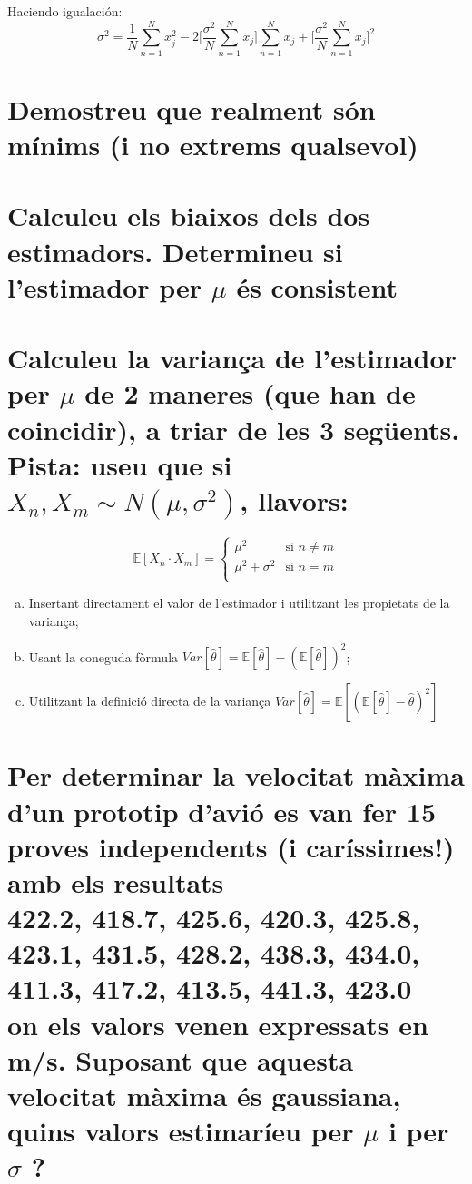 \documentclass[a4paper,10pt]{article}
\begin{document}
Haciendo igualación:
\begin{equation*}
\sigma^2 = \frac{1}{N}\sum_{n = 1}^{N} x_j^2 -2\Big[\frac{\sigma^2}{N}\sum_{n = 1}^{N} x_j\Big]\sum_{n = 1}^{N} x_j + \Big[\frac{\sigma^2}{N}\sum_{n = 1}^{N} x_j\Big]^2
\end{equation*}

\section{Demostreu que realment són mínims (i no extrems qualsevol)}

\section{Calculeu els biaixos dels dos estimadors. Determineu si l'estimador per $\mu$ és consistent}

\section{Calculeu la variança de l'estimador per $\mu$ de 2 maneres (que han de coincidir), a triar de les 3 següents. Pista: useu que si $X_n,X_m \sim N(\mu,\sigma^2)$, llavors:}

\begin{equation*}
\mathbb{E} [ X_n \cdot X_m ] = 
 \begin{cases} 
      \mu^2 & \text{si } n \neq m \\
      \mu^2 + \sigma^2 & \text{si } n = m\\
   \end{cases}
\end{equation*}

\begin{enumerate}[(a)]
\item Insertant directament el valor de l'estimador i utilitzant les propietats de la variança;
\item Usant la coneguda fòrmula $Var[\hat{\theta}] = \mathbb{E}[\hat{\theta}] - (\mathbb{E}[\hat{\theta}])^2$;
\item Utilitzant la definició directa de la variança $Var[\hat{\theta}] = \mathbb{E}[(\mathbb{E}[\hat{\theta}] - \hat{\theta})^2]$
\end{enumerate}

\section{Per determinar la velocitat màxima d'un prototip d'avió es van fer 15 proves independents (i
caríssimes!) amb els resultats
\\
422.2, 418.7, 425.6, 420.3, 425.8, 423.1, 431.5, 428.2, 438.3, 434.0, 411.3, 417.2, 413.5, 441.3, 423.0
\\
on els valors venen expressats en m/s. Suposant que aquesta velocitat màxima és gaussiana, quins
valors estimaríeu per $\mu$ i per $\sigma$ ?}
\end{document}
